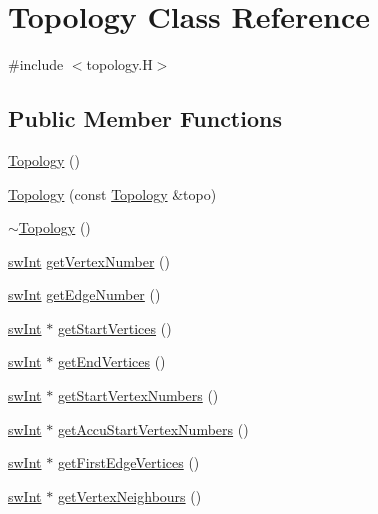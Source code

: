 \hypertarget{classTopology}{
\section{Topology Class Reference}
\label{classTopology}
}


{\ttfamily \#include $<$topology.H$>$}\subsection*{Public Member Functions}
\begin{DoxyCompactItemize}
\item 
\hyperlink{classTopology_aa3336e10118cd76ab4b4c2ebc5062a9a}{Topology} ()
\item 
\hyperlink{classTopology_a2659381e385f238e8d79ffb1a12e8d70}{Topology} (const \hyperlink{classTopology}{Topology} \&topo)
\item 
\hyperlink{classTopology_a3e447669757c8311c7f6f8edc705abf2}{$\sim$Topology} ()
\item 
\hyperlink{swMacro_8h_a113cf5f6b5377cdf3fac6aa4e443e9aa}{swInt} \hyperlink{classTopology_a1739e171c7b41c15482ed3237a02f726}{getVertexNumber} ()
\item 
\hyperlink{swMacro_8h_a113cf5f6b5377cdf3fac6aa4e443e9aa}{swInt} \hyperlink{classTopology_aa6a105cef3b34f662ce1f65ceed61417}{getEdgeNumber} ()
\item 
\hyperlink{swMacro_8h_a113cf5f6b5377cdf3fac6aa4e443e9aa}{swInt} $\ast$ \hyperlink{classTopology_a76539d6c987a01998e17868bb6b1f50f}{getStartVertices} ()
\item 
\hyperlink{swMacro_8h_a113cf5f6b5377cdf3fac6aa4e443e9aa}{swInt} $\ast$ \hyperlink{classTopology_a5d092ac1351da3209c474c6f363cde78}{getEndVertices} ()
\item 
\hyperlink{swMacro_8h_a113cf5f6b5377cdf3fac6aa4e443e9aa}{swInt} $\ast$ \hyperlink{classTopology_ad0330e56f4b1c6c5694fd346ff830319}{getStartVertexNumbers} ()
\item 
\hyperlink{swMacro_8h_a113cf5f6b5377cdf3fac6aa4e443e9aa}{swInt} $\ast$ \hyperlink{classTopology_af02d63f9a15edd86363e5395f6144279}{getAccuStartVertexNumbers} ()
\item 
\hyperlink{swMacro_8h_a113cf5f6b5377cdf3fac6aa4e443e9aa}{swInt} $\ast$ \hyperlink{classTopology_a4c930048181f07141db0378ad780109f}{getFirstEdgeVertices} ()
\item 
\hyperlink{swMacro_8h_a113cf5f6b5377cdf3fac6aa4e443e9aa}{swInt} $\ast$ \hyperlink{classTopology_abda57225c9ada001a4a3a7bb12a344c7}{getVertexNeighbours} ()

\end{DoxyCompactItemize}
